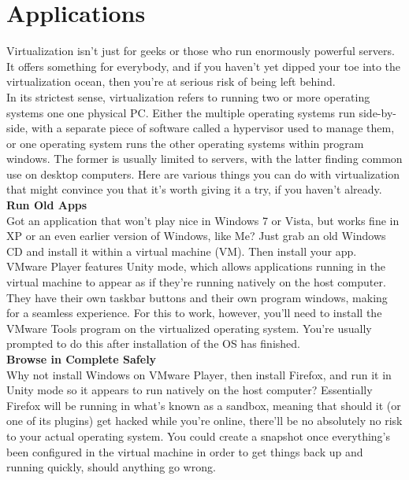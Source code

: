 \documentclass[a4paper,12pt]{report}
\begin{document}
\chapter{Applications}
Virtualization isn't just for geeks or those who run enormously powerful servers. It offers something for everybody, and if you haven't yet dipped your toe into the virtualization ocean, then you're at serious risk of being left behind.\\
\newline
In its strictest sense, virtualization refers to running two or more operating systems one one physical PC. Either the multiple operating systems run side-by-side, with a separate piece of software called a hypervisor used to manage them, or one operating system runs the other operating systems within program windows. The former is usually limited to servers, with the latter finding common use on desktop computers.
Here are various things you can do with virtualization that might convince you that it's worth giving it a try, if you haven't already.\\
\newline
\textbf{Run Old Apps}\\
Got an application that won't play nice in Windows 7 or Vista, but works fine in XP or an even earlier version of Windows, like Me? Just grab an old Windows CD and install it within a virtual machine (VM). Then install your app.\\
\newline
VMware Player features Unity mode, which allows applications running in the virtual machine to appear as if they're running natively on the host computer. They have their own taskbar buttons and their own program windows, making for a seamless experience. For this to work, however, you'll need to install the VMware Tools program on the virtualized operating system. You're usually prompted to do this after installation of the OS has finished.\\
\newline
\textbf{Browse in Complete Safely}\\
Why not install Windows on VMware Player, then install Firefox, and run it in Unity mode so it appears to run natively on the host computer?
Essentially Firefox will be running in what's known as a sandbox, meaning that should it (or one of its plugins) get hacked while you're online, there'll be no absolutely no risk to your actual operating system. You could create a snapshot once everything's been configured in the virtual machine in order to get things back up and running quickly, should anything go wrong.\\
\end{document}
